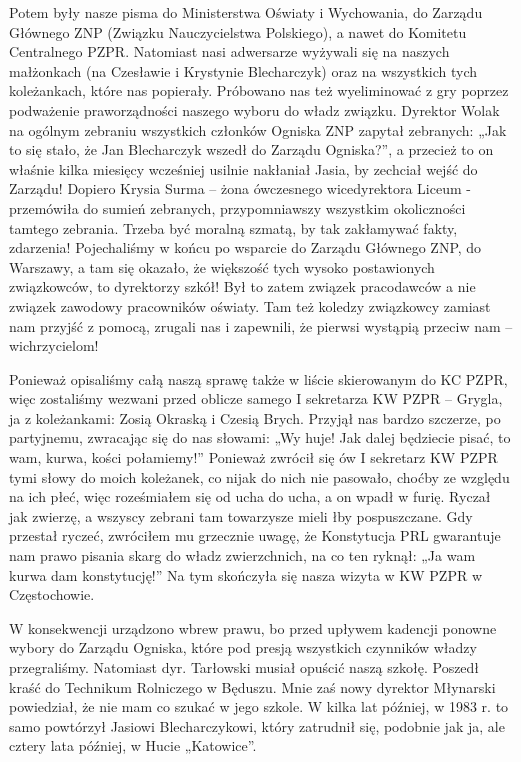 Potem były nasze pisma do Ministerstwa Oświaty i Wychowania, do Zarządu Głównego ZNP (Związku Nauczycielstwa Polskiego), a nawet do Komitetu Centralnego PZPR. Natomiast nasi adwersarze wyżywali się na naszych małżonkach (na Czesławie i Krystynie Blecharczyk) oraz na wszystkich tych koleżankach, które nas popierały. Próbowano nas też wyeliminować z gry poprzez podważenie praworządności naszego wyboru do władz związku. Dyrektor Wolak na ogólnym zebraniu wszystkich członków Ogniska ZNP zapytał zebranych: „Jak to się stało, że Jan Blecharczyk wszedł do Zarządu Ogniska?”, a przecież to on właśnie kilka miesięcy wcześniej usilnie nakłaniał Jasia, by zechciał wejść do Zarządu! Dopiero Krysia Surma – żona ówczesnego wicedyrektora Liceum - przemówiła do sumień zebranych, przypomniawszy wszystkim okoliczności tamtego zebrania. Trzeba być moralną szmatą, by tak zakłamywać fakty, zdarzenia! Pojechaliśmy w końcu po wsparcie do Zarządu Głównego ZNP, do Warszawy, a tam się okazało, że większość tych wysoko postawionych związkowców, to dyrektorzy szkół! Był to zatem związek pracodawców a nie związek zawodowy pracowników oświaty. Tam też koledzy związkowcy zamiast nam przyjść z pomocą, zrugali nas i zapewnili, że pierwsi wystąpią przeciw nam – wichrzycielom!

Ponieważ opisaliśmy całą naszą sprawę także w liście skierowanym do KC PZPR, więc zostaliśmy wezwani przed oblicze samego I sekretarza KW PZPR – Grygla, ja z koleżankami: Zosią Okraską i Czesią Brych. Przyjął nas bardzo szczerze, po partyjnemu, zwracając się do nas słowami: „Wy huje! Jak dalej będziecie pisać, to wam, kurwa, kości połamiemy!” Ponieważ zwrócił się ów I sekretarz KW PZPR tymi słowy do moich koleżanek, co nijak do nich nie pasowało, choćby ze względu na ich płeć, więc roześmiałem się od ucha do ucha, a on wpadł w furię. Ryczał jak zwierzę, a wszyscy zebrani tam towarzysze mieli łby pospuszczane. Gdy przestał ryczeć, zwróciłem mu grzecznie uwagę, że Konstytucja PRL gwarantuje nam prawo pisania skarg do władz zwierzchnich, na co ten ryknął: „Ja wam kurwa dam konstytucję!” Na tym skończyła się nasza wizyta w KW PZPR w Częstochowie.

W konsekwencji urządzono wbrew prawu, bo przed upływem kadencji ponowne wybory do Zarządu Ogniska, które pod presją wszystkich czynników władzy przegraliśmy. Natomiast dyr. Tarłowski musiał opuścić naszą szkołę. Poszedł kraść do Technikum Rolniczego w Będuszu. Mnie zaś nowy dyrektor Młynarski powiedział, że nie mam co szukać w jego szkole. W kilka lat później, w 1983 r. to samo powtórzył Jasiowi Blecharczykowi, który zatrudnił się, podobnie jak ja, ale cztery lata później, w Hucie „Katowice”.

